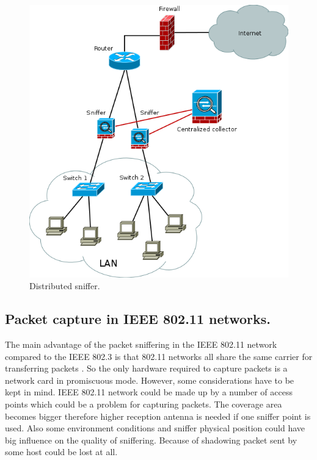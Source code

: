 \documentclass[thesis=M,english]{FITthesis}[2011/07/15]
\begin{document}
\begin{itemize}
\begin{figure}[h]
\centering
\includegraphics[scale=0.6]{images/distributed_sniffering.png}
\caption{Distributed sniffer.}
\label{fig:distributed_sniffering}
\end{figure}
\end{itemize}
\subsection{Packet capture in IEEE 802.11 networks.}
The main advantage of the packet sniffering in the IEEE 802.11 network compared to the IEEE 802.3 is that 802.11 networks all share the same carrier for transferring packets \cite{ieee_802_11}. So the only hardware required to capture packets is a network card in promiscuous mode. However, some considerations have to be kept in mind. IEEE 802.11 network could be made up by a number of access points which could be a problem for capturing packets. The coverage area becomes bigger therefore higher reception antenna is needed if one sniffer point is used. Also some environment conditions and sniffer physical position could have big influence on the quality of sniffering. Because of shadowing packet sent by some host could be lost at all.
\end{document}

